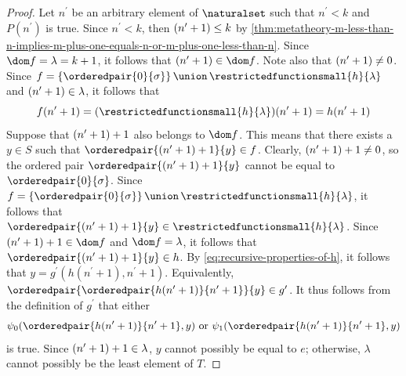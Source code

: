 \begin{proof}
    \vspace{0.3cm}
    \noindent
    Let \( n^{\prime} \) be an arbitrary element of \( \naturalset \) such that \( n^{\prime} < k \) and \( P(n^{\prime}) \) is true.
    Since \( n^{\prime} < k \), then \( \mleft( n^{\prime} + 1 \mright) \leq k \) by \cref{thm:metatheory-m-less-than-n-implies-m-plus-one-equals-n-or-m-plus-one-less-than-n}.
    Since \( \dom f = \lambda = k + 1 \), it follows that \( \mleft( n^{\prime} + 1 \mright) \in \dom f \).
    Note also that \( \mleft( n^{\prime} + 1 \mright) \neq 0 \).
    Since \( f = \mleft\{ \orderedpair{0}{\sigma} \mright\} \,{\union}\, \restrictedfunctionsmall{h}{\lambda} \) and \( \mleft( n^{\prime} + 1 \mright) \in \lambda \),
    it follows that
    \begin{equation}
        \label{eq:value-of-f-at-n-prime-plus-one-equals-value-of-h-at-n-prime-plus-one}
        f(n^{\prime} + 1) = (\restrictedfunctionsmall{h}{\lambda})(n^{\prime} + 1) = h(n^{\prime} + 1)
    \end{equation}
    Suppose that \( \mleft( n^{\prime} + 1 \mright) + 1 \) also belongs to \( \dom f \).
    This means that there exists a \( y \in S \) such that \( \orderedpair{\mleft( n^{\prime} + 1 \mright) + 1 }{y} \in f \).
    Clearly, \( \mleft( n^{\prime} + 1 \mright) + 1 \neq 0 \), so the ordered pair \( \orderedpair{\mleft( n^{\prime} + 1 \mright) + 1 }{y} \) cannot be
    equal to \( \orderedpair{0}{\sigma} \).
    Since \( f = \mleft\{ \orderedpair{0}{\sigma} \mright\} \,{\union}\, \restrictedfunctionsmall{h}{\lambda} \), it follows that
    \( \orderedpair{\mleft( n^{\prime} + 1 \mright) + 1}{y} \in \restrictedfunctionsmall{h}{\lambda} \).
    Since \( \mleft( n^{\prime} + 1 \mright) + 1 \in \dom f \) and \( \dom f = \lambda \), it follows that
    \( \orderedpair{\mleft( n^{\prime} + 1 \mright) + 1}{y} \in h \).
    By \eqref{eq:recursive-properties-of-h}, it follows that \( y = g^{\prime}(h(n^{\prime} + 1), n^{\prime} + 1) \).
    Equivalently, \( \orderedpair{\orderedpair{h(n^{\prime} + 1)}{n^{\prime} + 1}}{y} \in g^{\prime} \).
    It thus follows from the definition of \( g^{\prime} \) that either
    \begin{equation*}
        \psi_{0}(\orderedpair{h(n^{\prime} + 1)}{n^{\prime} + 1}, y) \ \text{or}
        \ \psi_{1}(\orderedpair{h(n^{\prime} + 1)}{n^{\prime} + 1}, y)
    \end{equation*}
    is true.
    Since \( \mleft( n^{\prime} + 1 \mright) + 1 \in \lambda \), \( y \) cannot possibly be equal to \( e \);
    otherwise, \( \lambda \) cannot possibly be the least element of \( T \).

\end{proof}
